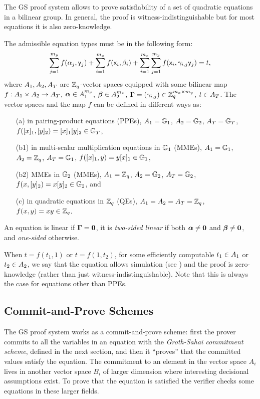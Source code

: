 The GS proof system allows to prove satisfiability of a set of quadratic equations in a bilinear group. In general, the proof is witness-indistinguishable but for most equations it is also zero-knowledge.

The admissible equation types must be in the following form:
\begin{equation}\label{gseq}
\sum_{j=1}^{m_y} f(\alpha_j, \mathsf{y}_j)+\sum_{i=1}^{m_x} f(\mathsf{x}_i, \beta_i)+\sum_{i=1}^{m_x} \sum_{j=1}^{m_y}  f(\mathsf{x}_i,\gamma_{i,j} \mathsf{y}_j)=t,
\end{equation}
 where $A_1,A_2,A_T$ are $\mathbb{Z}_q$-vector spaces equipped with some bilinear map $f:A_1\times A_2 \rightarrow A_T$, $\boldsymbol \alpha  \in A_1^{m_y}$, $\boldsymbol \beta  \in A_2^{m_x}$, $\mathbf{{\Gamma}}=(\gamma_{i,j}) \in \mathbb{Z}_q^{m_x\times m_y}$, $t \in A_T$. The vector spaces and the map $f$ can be defined in different ways as:
\begin{itemize}
\item[(a)] in pairing-product equations (PPEs), $A_1=\mathbb{G}_1$, $A_2=\mathbb{G}_2$, $A_T=\mathbb{G}_T$, $f([x]_1,[y]_2)=[x]_1 [y]_2 \in \mathbb{G}_T$,
\item[(b1)] in multi-scalar multiplication equations in $\mathbb{G}_1$ (MMEs), $A_1=\mathbb{G}_1$, $A_2=\mathbb{Z}_q$, $A_T=\mathbb{G}_1$, $f([x]_1,y)=y [x]_1 \in \mathbb{G}_1$,
\item[(b2)] MMEs in $\mathbb{G}_2$ (MMEs),  $A_1=\mathbb{Z}_q$, $A_2=\mathbb{G}_2$, $A_T=\mathbb{G}_2$, $f(x,[y]_2)=x [y]_2 \in \mathbb{G}_2$, and
\item[(c)] in quadratic equations in $\mathbb{Z}_q$ (QEs), $A_1=A_2=A_T=\mathbb{Z}_q$, $f(x,y)=xy \in \mathbb{Z}_q$.
\end{itemize} 
 An equation is linear if $\mathbf{{\Gamma}}=\mathbf{0}$, 
 it is \textit{two-sided linear} if both $\boldsymbol \alpha \neq \mathbf{0}$ and $\boldsymbol \beta \neq \mathbf{0}$, and \textit{one-sided} otherwise.

When $t=f(t_1,1)$ or $t=f(1,t_2)$, for some efficiently computable $t_1\in A_1$ or $t_2\in A_2$, we say that the equation allows simulation (see \cite[Section~11]{SIAMJC:GroSah12}) and the proof is zero-knowledge (rather than just witness-indistinguishable). Note that this is always the case for equations other than PPEs.

\subsection{Commit-and-Prove Schemes} The GS proof system works as a commit-and-prove scheme: first the prover commits to 
all the variables in an equation with the \emph{Groth-Sahai commitment scheme}, defined in the next section, and then it ``proves'' that the committed values satisfy the equation. The commitment to an element in the vector space $A_i$ lives in another vector space $B_i$ of larger dimension where interesting decisional assumptions exist. To prove that the equation is satisfied the verifier checks some equations in these larger fields.

